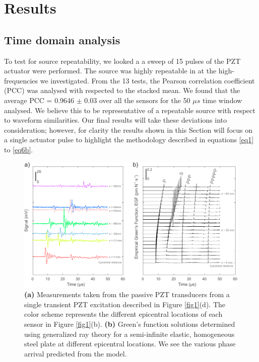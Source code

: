 \documentclass[preprint,3p, 11pt,authoryear]{elsarticle}
\begin{document}
\section{Results}
\label{results}
\subsection{Time domain analysis}
To test for source repeatability, we looked a a sweep of 15 pulses of the PZT actuator were performed.  The source was highly repeatable in at the high-frequencies we investigated.  From the 13 tests, the Pearson correlation coefficient (PCC) was analysed with respected to the stacked mean. We found that the average PCC = 0.9646 $\pm$ 0.03 over all the sensors for the 50 $\mu s$ time window analysed. We believe this to be representative of a repeatable source with respect to waveform similarities. Our final results will take these deviations into consideration; however, for clarity the results shown in this Section will focus on a single actuator pulse to highlight the methodology described in equations \eqref{eq1} to \eqref{eq6b}.

\begin{figure}[ht]
     	\centering
\includegraphics[scale= 1.0]{FIG3.pdf} 
\caption{\textbf{(a)} Measurements taken from the passive PZT transducers from a single transient PZT excitation described in Figure \ref{fig1}(d). The color scheme represents the different epicentral locations of each sensor in Figure \ref{fig1}(b).  \textbf{(b)} Green's function solutions determined using generalized ray theory for a semi-infinite elastic, homogeneous steel plate at different epicentral locations.  We see the various phase arrival predicted from the model.}
	\label{fig3} 
\end{figure}
\end{document}
